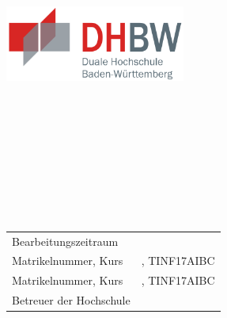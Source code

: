 \begin{titlepage}
\includegraphics[height=2.5cm]{images/dhbw.png}
\begin{center}
    \vspace*{\baselineskip}{\LARGE \textbf \titel}\\
    \\
    \\
    \\
    \\
    \vspace*{.25\baselineskip}{\Large \textbf \autora}\\
    \\
    \vspace*{.25\baselineskip}{\Large \textbf \autorb}\\
\end{center}
\vfill
\begin{tabularx}{\textwidth}{Xl}
    Bearbeitungszeitraum & \bearbeitung{} \\
    Matrikelnummer, Kurs & \matrikelnrkursa{}, TINF17AIBC \\
    Matrikelnummer, Kurs & \matrikelnrkursb{}, TINF17AIBC \\
    Betreuer der Hochschule & \betreuer{} \\
\end{tabularx}
\end{titlepage}
